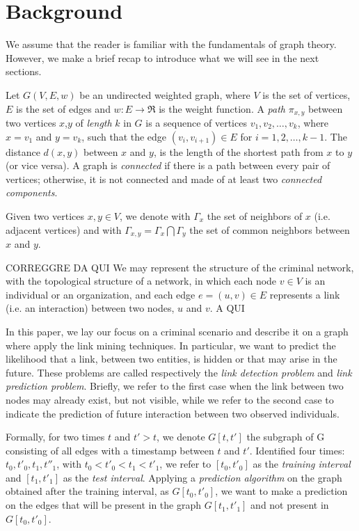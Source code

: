 \section{Background}
\label{sec:background}

We assume that the reader is familiar with the fundamentals of graph theory. 
However, we make a brief recap to introduce what we will see in the next sections.

Let $G(V,E,w)$ be an undirected weighted graph, where $V$ is the set of vertices, $E$ is the set of edges and $w:E\rightarrow\Re$ is the weight function. 
A \textit{path} $\pi_{x,y}$ between two vertices $x$,$y$ of \textit{length} $k$ in $G$ is a sequence of vertices $v_{1},v_{2},\ldots,v_{k}$, where $x = v_{1}$ and $y = v_{k}$, such that the edge $(v_{i},v_{i+1}) \in E$ for $i = 1, 2,\ldots,k-1$. 
The distance $d(x,y)$ between $x$ and $y$, is the length of the shortest path from $x$ to $y$ (or vice versa).
A graph is \textit{connected} if there is a path between every pair of vertices; otherwise, it is not connected and made of at least two \textit{connected components}.

Given two vertices $x,y \in V$, we denote with $\Gamma_{x}$ the set of neighbors of $x$ (i.e. adjacent vertices) and with $\Gamma_{x,y} = \Gamma_{x} \bigcap \Gamma_{y}$ the set of common neighbors between $x$ and $y$.

CORREGGRE DA QUI
We may represent the structure of the criminal network, with the topological structure of a network, in which each node $v \in V$ is an individual or an organization, and each edge $e=(u,v)\in E$ represents a link (i.e. an interaction) between two nodes, $u$ and $v$. 
A QUI

In this paper, we lay our focus on a criminal scenario and describe it on a graph where apply the link mining techniques. In particular, we want to predict the likelihood that a link, between two entities, is hidden or that may arise in the future. These problems are called respectively the \textit{link detection problem} and \textit{link prediction problem}. Briefly, we refer to the first case when the link between two nodes may already exist, but not visible, while we refer to the second case to indicate the prediction of future interaction between two observed individuals\cite{Hasan2011}.

Formally, for two times $t$ and $t' > t$, we denote $G[t,t']$ the subgraph of G consisting of all edges with a timestamp between $t$ and $t'$. Identified four times: $t_{0}, t'_{0}, t_{1}, t''_{1}$, with $t_{0}<t'_{0}<t_{1}<t'_{1}$, we refer to $[t_{0},t'_{0}]$ as the \textit{training interval} and $[t_{1},t'_{1}]$ as the \textit{test interval}. Applying a \textit{prediction algorithm} on the graph obtained after the training interval, as $G[t_{0},t'_{0}]$, we want to make a prediction on the edges that will be present in the graph $G[t_{1},t'_{1}]$ and not present in $G[t_{0},t'_{0}]$\cite{Liben-Nowell}.

